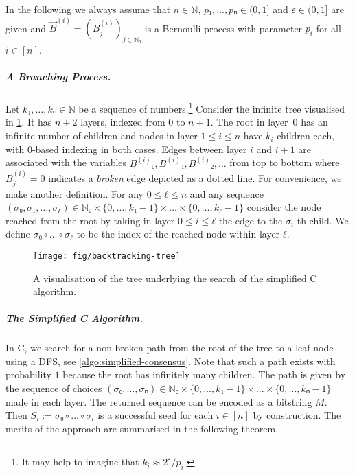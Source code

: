 \documentclass[cleveref,thm-restate]{lipics-v2021}
\def\consensus{\texorpdfstring{C\scalebox{0.8}{ONSENSUS}}{CONSENSUS}\xspace}
\def\vecB{\vec{B}}
\def\B#1{B^{(#1)}}
\def\vB#1{\vecB^{(#1)}}
\begin{document}
In the following we always assume that $n ∈ ℕ$, $p₁,…,pₙ ∈ (0,1]$ and $ε ∈ (0,1]$ are given and $\vB{i} = (\B{i}_j)_{j ∈ ℕ₀}$ is a Bernoulli process with parameter $p_i$ for all $i ∈ [n]$.

\subparagraph{A Branching Process.}
Let $k₁,…,kₙ ∈ ℕ$ be a sequence of numbers.\footnote{It may help to imagine that $k_i ≈ 2^ε/p_i$.} Consider the infinite tree visualised in \cref{fig:branching-process}. It has $n+2$ layers, indexed from $0$ to $n+1$. The root in layer~$0$ has an infinite number of children and nodes in layer $1 ≤ i ≤ n$ have $k_i$ children each, with $0$-based indexing in both cases. Edges between layer $i$ and $i+1$ are associated with the variables $\B{i}₀,\B{i}₁,\B{i}₂,…$ from top to bottom where $\B{i}_j = 0$ indicates a \emph{broken} edge depicted as a dotted line.
For convenience, we make another definition. For any $0 ≤ ℓ ≤ n$ and any sequence $(σ₀,σ₁,…,σ_ℓ) ∈ ℕ₀ × \{0,…,k₁-1\} × … × \{0,…,k_ℓ-1\}$ consider the node reached from the root by taking in layer $0 ≤ i ≤ ℓ$ the edge to the $σ_i$-th child. We define $σ₀∘…∘σ_ℓ$ to be the index of the reached node within layer $ℓ$.

\begin{figure}[bt]
    \centering
    \texttt{[image: fig/backtracking-tree]}
    \caption{A visualisation of the tree underlying the search of the simplified \consensus algorithm.}
    \label{fig:branching-process}
\end{figure}

\subparagraph{The Simplified \consensus Algorithm.}
In \consensus, we search for a non-broken path from the root of the tree to a leaf node using a DFS, see \cref{algo:simplified-consensus}. Note that such a path exists with probability $1$ because the root has infinitely many children. The path is given by the sequence of choices $(σ₀,…,σₙ) ∈ ℕ₀ × \{0,…,k₁-1\} × … × \{0,…,kₙ-1\}$ made in each layer.
The returned sequence can be encoded as a bitstring $M$. Then $S_i := σ₀∘…∘σ_i$ is a successful seed for each $i ∈ [n]$ by construction. The merits of the approach are summarised in the following theorem.
\end{document}
